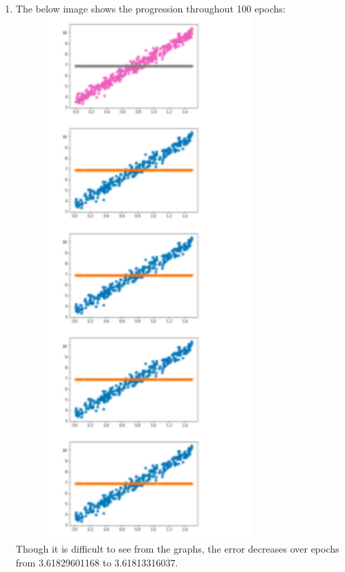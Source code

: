 \documentclass{article}
\begin{document}
\begin{enumerate}
\item The below image shows the progression throughout 100 epochs:\\
\includegraphics[width=10cm, height=20cm]{epochs}\\

Though it is difficult to see from the graphs, the error decreases over epochs from 3.61829601168 to 3.61813316037.
\end{enumerate}
\end{document}
